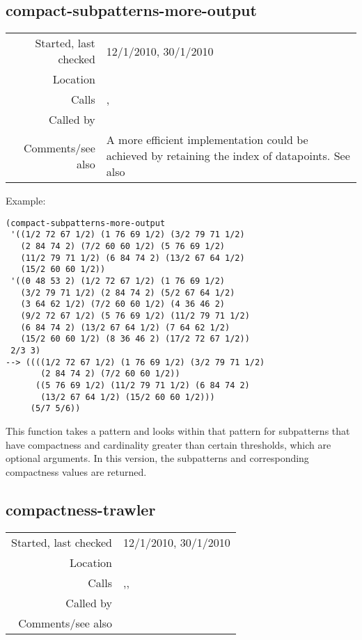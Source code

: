 \subsection*{compact-subpatterns-more-output}\label{fun:compact-subpatterns-more-output}

\vspace{0.3cm}
\begin{tabular}{r|p{8cm}}
Started, last checked & 12/1/2010, 30/1/2010 \\
Location & \nameref{sec:compactness-trawl} \\
Calls & \nameref{fun:compactness}, \nameref{fun:my-last} \\
Called by & \nameref{fun:compactness-trawler} \\
Comments/see also & A more efficient implementation could be achieved by retaining the index of datapoints. See also \nameref{fun:compact-subpatterns}
\end{tabular}

\vspace{0.5cm}
\noindent Example:
\begin{verbatim}
(compact-subpatterns-more-output
 '((1/2 72 67 1/2) (1 76 69 1/2) (3/2 79 71 1/2)
   (2 84 74 2) (7/2 60 60 1/2) (5 76 69 1/2)
   (11/2 79 71 1/2) (6 84 74 2) (13/2 67 64 1/2)
   (15/2 60 60 1/2))
 '((0 48 53 2) (1/2 72 67 1/2) (1 76 69 1/2)
   (3/2 79 71 1/2) (2 84 74 2) (5/2 67 64 1/2)
   (3 64 62 1/2) (7/2 60 60 1/2) (4 36 46 2)
   (9/2 72 67 1/2) (5 76 69 1/2) (11/2 79 71 1/2)
   (6 84 74 2) (13/2 67 64 1/2) (7 64 62 1/2)
   (15/2 60 60 1/2) (8 36 46 2) (17/2 72 67 1/2))
 2/3 3)
--> ((((1/2 72 67 1/2) (1 76 69 1/2) (3/2 79 71 1/2)
       (2 84 74 2) (7/2 60 60 1/2))
      ((5 76 69 1/2) (11/2 79 71 1/2) (6 84 74 2)
       (13/2 67 64 1/2) (15/2 60 60 1/2)))
     (5/7 5/6))
\end{verbatim}

\noindent This function takes a pattern and looks
within that pattern for subpatterns that have
compactness and cardinality greater than certain
thresholds, which are optional arguments. In this
version, the subpatterns and corresponding compactness
values are returned.


\subsection*{compactness-trawler}\label{fun:compactness-trawler}

\vspace{0.3cm}
\begin{tabular}{r|p{8cm}}
Started, last checked & 12/1/2010, 30/1/2010 \\
Location & \nameref{sec:compactness-trawl} \\
Calls & \nameref{fun:compact-subpatterns-more-output},\newline \nameref{fun:test-translation}, \nameref{fun:write-to-file} \\
Called by & \\
Comments/see also &
\end{tabular}


